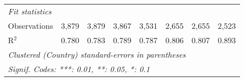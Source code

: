 \begin{tabular}{lccccccc}
   \midrule \emph{Fit statistics}\\
   Observations                                                        & 3,879   & 3,879        & 3,867         & 3,531         & 2,655          & 2,655          & 2,523\\  
   R$^2$                                                               & 0.780   & 0.783        & 0.789         & 0.787         & 0.806          & 0.807          & 0.893\\  
   \midrule
   \multicolumn{8}{l}{\emph{Clustered (Country) standard-errors in parentheses}}\\
   \multicolumn{8}{l}{\emph{Signif. Codes: ***: 0.01, **: 0.05, *: 0.1}}\\
\end{tabular}
\par\endgroup


